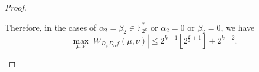 \documentclass{article}
\newcommand{\F}{\mathbb{F}}
\newcommand{\0}{\textbf{0}}
\newcommand{\1}{\textbf{1}}
\newcommand{\TRACE}{\operatorname{Tr}_1^k}
\theoremstyle{plain}
\begin{document}
\begin{proof}
\begin{enumerate}[label=\textbf{Case \arabic*},wide = 0pt]
    Therefore, in the cases of $ \alpha_2=\beta_2\in\F_{2^k}^* $ or $ \alpha_2=0 $ or $ \beta_2=0 $, 
    we have 
    \[\max_{\mu,\nu}|W_{D_{\beta}D_{\alpha}f}(\mu,\nu)|\le 2^{k+1}\left\lfloor 2^{\frac{k}{2}+1}\right\rfloor+2^{k+2}.\]

    







\end{enumerate}
\end{proof}
\end{document}
